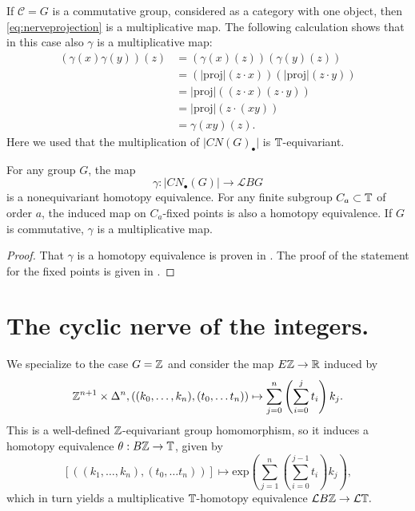 If $\mathcal{C} = G$ is a commutative group, considered as a category with one object,
then \eqref{eq:nerveprojection} is a multiplicative map.
The following calculation shows that  in this case also $\gamma$ is
 a multiplicative map:
\begin{align*}
(\gamma(x) \gamma(y))(z) &= (\gamma(x)(z)) ( \gamma(y)(z))\\
&= (|\mathrm{proj}|(z\cdot x))  (|\mathrm{proj}|(z\cdot y))\\
&= |\mathrm{proj}|((z\cdot x)(z\cdot y))\\
&= |\mathrm{proj}|(z\cdot(xy))\\
&= \gamma(xy)(z).
\end{align*}
Here we used that the multiplication of
$\lvert CN(G)_\bullet \rvert$
is $\mathbb{T}$-equivariant.

\begin{thm}
For any group $G$, the map
$$\gamma: \left| CN_\bullet(G) \right| \rightarrow \mathcal{L}BG$$
is a nonequivariant homotopy equivalence.
For any finite subgroup $C_a\subset \mathbb{T}$ of order $a$, the
induced map on
$C_a$-fixed points is also a homotopy equivalence. If $G$ is commutative, $\gamma$
is a multiplicative map.
\end{thm}

\begin{proof}
That $\gamma$ is a homotopy equivalence is proven in \cite[Theorem~7.3.11, \pno~246]{loday}.
The proof of the statement for the fixed points is given in \cite[Proposition~2.6]{bhmcyclotomic}.
\end{proof}

\section{The cyclic nerve of the integers.}
We specialize to the case $G=\mathbb{Z}$ and consider the map
$E\mathbb{Z}\to \mathbb{R}$ induced by
\[
\mathbb{Z}^{n+1}\times \Delta^{n}, ((k_0,\ldots, k_n),(t_0,\ldots t_n))\mapsto 
\sum_{j=0}^n\left(\sum_{i=0}^{j} t_i\right)k_j.
\]
This is a well-defined $\mathbb{Z}$-equivariant group homomorphism,
so it induces
a homotopy equivalence
$\theta: B\mathbb{Z}\rightarrow \mathbb{T}$, given by 
\begin{equation}\label{eq:circleclassifying}
[((k_1,\ldots, k_n),(t_0,\ldots t_n))]\mapsto \mathrm{exp}
\left(\sum_{j=1}^n\left(\sum_{i=0}^{j-1} t_i\right)k_j\right),
\end{equation}
which in turn yields a multiplicative $\mathbb{T}$-homotopy equivalence
$\mathcal{L}B\mathbb{Z}\rightarrow \mathcal{L}\mathbb{T}.$ 


